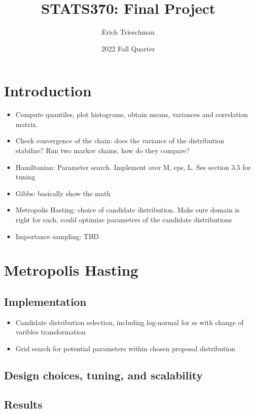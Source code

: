 \documentclass{article}
\title{STATS370: Final Project}
\author{Erich Trieschman}
\date{2022 Fall Quarter}
\begin{document}
\maketitle


\section*{Introduction}
\begin{itemize}
  \item Compute quantiles, plot histograms, obtain means, variances and correlation matrix.
  \item Check convergence of the chain: does the variance of the distribution stabilize? Run two markov chains, how do they compare?
  \item Hamiltonian: Parameter search. Implement over M, eps, L. See section 3.5 for tuning
  \item Gibbs: basically show the math
  \item Metropolis Hasting: choice of candidate distribution. Make sure domain is right for each, could optimize parameters of the candidate distributions
  \item Importance sampling: TBD
\end{itemize}

\section{Metropolis Hasting}
\subsection*{Implementation}
\begin{itemize}
  \item Candidate distribution selection, including log-normal for ss with change of varibles transformation
  \item Grid search for potential parameters within chosen proposal distribution
\end{itemize}

\subsection*{Design choices, tuning, and scalability}
\subsection*{Results}
\end{document}
